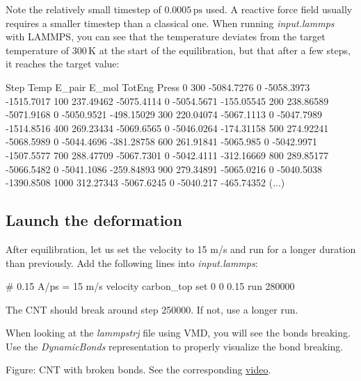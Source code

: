 \noindent Note the relatively small timestep of $0.0005\,\text{ps}$
used. A reactive force field usually requires a smaller timestep
than a classical one.
When running \textit{input.lammps} with LAMMPS, you can see that the
temperature deviates from the target temperature of $300\,\text{K}$
at the start of the equilibration, but that
after a few steps, it reaches the target value:

\begin{lcverbatim}
Step  Temp           E_pair         E_mol          TotEng         Press     
0     300           -5084.7276      0             -5058.3973     -1515.7017    
100   237.49462     -5075.4114      0             -5054.5671     -155.05545    
200   238.86589     -5071.9168      0             -5050.9521     -498.15029    
300   220.04074     -5067.1113      0             -5047.7989     -1514.8516    
400   269.23434     -5069.6565      0             -5046.0264     -174.31158    
500   274.92241     -5068.5989      0             -5044.4696     -381.28758    
600   261.91841     -5065.985       0             -5042.9971     -1507.5577    
700   288.47709     -5067.7301      0             -5042.4111     -312.16669    
800   289.85177     -5066.5482      0             -5041.1086     -259.84893    
900   279.34891     -5065.0216      0             -5040.5038     -1390.8508    
1000  312.27343     -5067.6245      0             -5040.217      -465.74352
(...)
\end{lcverbatim}

\subsection{Launch the deformation}
After equilibration, let us set the velocity to 15 m/s and run for
a longer duration than previously. Add the following lines into
\textit{input.lammps}:

\begin{lcverbatim}
# 0.15 A/ps = 15 m/s
velocity carbon_top set 0 0 0.15
run 280000
\end{lcverbatim}

\noindent The CNT should break around step 250000. If not, 
use a longer run. 

\vspace{0.25cm} \noindent When looking at the \textit{lammpstrj} file using VMD, you will see
the bonds breaking. Use the \textit{DynamicBonds}
representation to properly visualize the bond breaking.

\vspace{0.25cm} Figure: CNT with broken bonds. See the corresponding \href{https://youtu.be/H2_cjoTcVAM}{video}.

